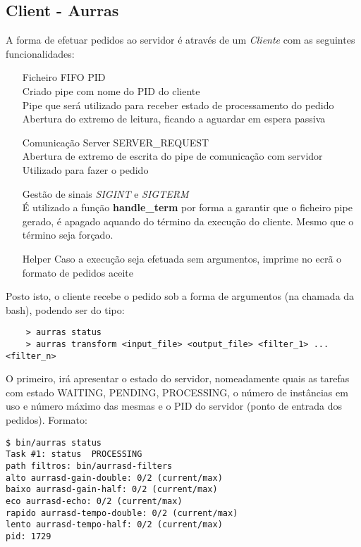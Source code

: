 \documentclass[11pt]{article}
\begin{document}
\subsection{Client - Aurras} \label{aurras}

A forma de efetuar pedidos ao servidor é através de um \textit{Cliente} com as seguintes funcionalidades:

\begin{itemize}
    \item [Ficheiro FIFO] {PID\\
          Criado pipe com nome do PID do cliente\\
          Pipe que será utilizado para receber estado de processamento do pedido\\
          Abertura do extremo de leitura, ficando a aguardar em espera passiva}
    \item [Comunicação Server] {SERVER\_REQUEST\\
          Abertura de extremo de escrita do pipe de comunicação com servidor\\
          Utilizado para fazer o pedido}
    \item [Gestão de sinais] {\textit{SIGINT} e \textit{SIGTERM}\\
          É utilizado a função \textbf{handle\_term} por forma a garantir que o ficheiro pipe gerado, é apagado aquando
          do término da execução do cliente. Mesmo que o término seja forçado.}
    \item[Helper] {Caso a execução seja efetuada sem argumentos, imprime no ecrã o formato de pedidos aceite}
\end{itemize}

Posto isto, o cliente recebe o pedido sob a forma de argumentos (na chamada da bash), podendo ser do tipo:
\begin{verbatim}
    > aurras status
    > aurras transform <input_file> <output_file> <filter_1> ... <filter_n>
\end{verbatim}

O primeiro, irá apresentar o estado do servidor, nomeadamente quais as tarefas com estado WAITING, PENDING, PROCESSING, o número de instâncias em uso
e número máximo das mesmas e o PID do servidor (ponto de entrada dos pedidos). Formato:
\begin{verbatim}
$ bin/aurras status
Task #1: status  PROCESSING
path filtros: bin/aurrasd-filters
alto aurrasd-gain-double: 0/2 (current/max)
baixo aurrasd-gain-half: 0/2 (current/max)
eco aurrasd-echo: 0/2 (current/max)
rapido aurrasd-tempo-double: 0/2 (current/max)
lento aurrasd-tempo-half: 0/2 (current/max)
pid: 1729
\end{verbatim}
\end{document}
